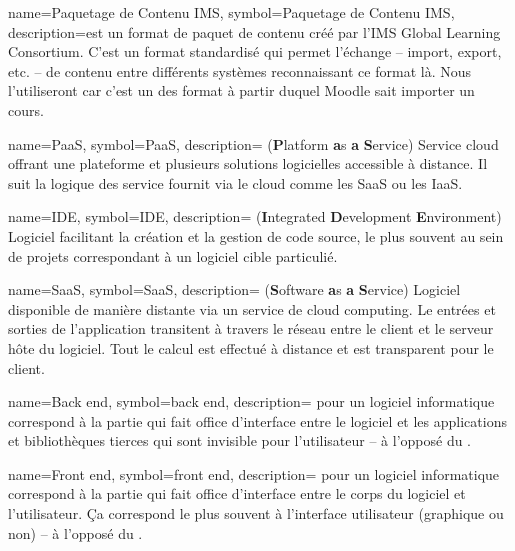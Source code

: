   {
	name=Paquetage de Contenu IMS,
	symbol=Paquetage de Contenu IMS,
	description={est un format de paquet de contenu créé par l'IMS Global Learning Consortium. C'est
un format standardisé qui permet l'échange -- import, export, etc. -- de contenu
entre différents systèmes reconnaissant ce format là. Nous l'utiliseront car
c'est un des format à partir duquel Moodle sait importer un cours.}}

  {
	name=PaaS,
	symbol=PaaS,
	description={
	  ({\bf P}latform {\bf a}s {\bf a} {\bf S}ervice) Service cloud
  offrant une plateforme et plusieurs solutions logicielles accessible à
distance. Il suit la logique des service fournit via le cloud comme les SaaS ou
les IaaS.}
}

  {
	name=IDE,
	symbol=IDE,
	description={
	  ({\bf I}ntegrated {\bf D}evelopment {\bf E}nvironment) Logiciel facilitant
	  la création et la gestion de code source, le plus souvent au sein de
	  projets correspondant à un logiciel cible particulié.
	}
  }

  {
	name=SaaS,
	symbol=SaaS,
	description={
	  ({\bf S}oftware {\bf a}s {\bf a} {\bf S}ervice) Logiciel disponible de
	  manière distante via un service de cloud computing. Le entrées et sorties
	  de l'application transitent à travers le réseau entre le client et le
	  serveur hôte du logiciel. Tout le calcul est effectué à distance et est
	  transparent pour le client.
	}
  }

  {
	name=Back end,
	symbol=back end,
	description={
	  pour un logiciel informatique correspond à la partie qui fait office
	  d'interface entre le logiciel et les applications et bibliothèques tierces
	  qui sont invisible pour l'utilisateur -- à l'opposé du .
	}
  }

  {
	name=Front end,
	symbol=front end,
	description={
	  pour un logiciel informatique correspond à la partie qui fait office
	  d'interface entre le corps du logiciel et l'utilisateur. Ça correspond le
	  plus souvent à l'interface utilisateur (graphique ou non) -- à l'opposé du
	  .
	}
  }


